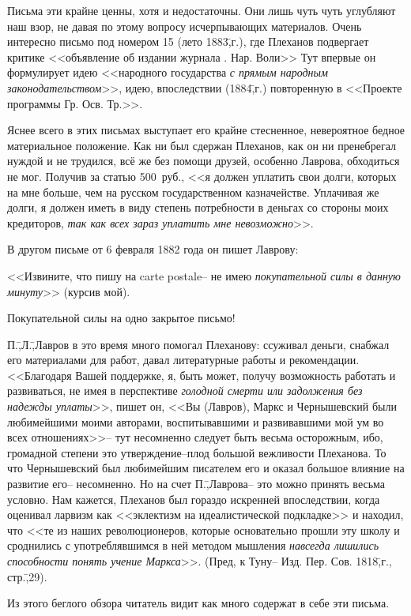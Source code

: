 Письма эти крайне ценны, хотя и недостаточны. Они лишь чуть чуть углубляют наш взор, не давая по этому вопросу исчерпывающих материалов. Очень интересно письмо под номером 15 (лето 1883\=,г.), где Плеханов подвергает критике <<объявление об издании журнала . Нар. Воли\grqq>> Тут впервые он формулирует идею <<народного государства \emph{с прямым народным законодательством}>>, идею, впоследствии (1884\=,г.) повторенную в <<Проекте программы Гр. Осв. Тр.>>.

Яснее всего в этих письмах выступает его крайне стесненное, невероятное бедное материальное положение. Как ни был сдержан Плеханов, как он ни пренебрегал нуждой и не трудился, всё же без помощи друзей, особенно Лаврова, обходиться не мог. Получив за статью 500~руб., <<я должен уплатить свои долги, которых на мне больше, чем на русском государственном казначействе. Уплачивая же долги, я должен иметь в виду степень потребности в деньгах со стороны моих кредиторов, \emph{так как всех зараз уплатить мне невозможно}>>.

В другом письме от 6 февраля 1882 года он пишет Лаврову:

<<Извините, что пишу на carte postale\--- не имею \emph{покупательной силы в данную минуту}>> (курсив мой).

Покупательной силы на одно закрытое письмо!

П.\=,Л.\=,Лавров в это время много помогал Плеханову: ссуживал деньги, снабжал его материалами для работ, давал литературные работы и рекомендации. <<Благодаря Вашей поддержке, я, быть может, получу возможность работать и развиваться, не имея в перспективе \emph{голодной смерти или задолжения без надежды уплаты}>>, пишет он, <<Вы (Лавров), Маркс и Чернышевский были любимейшими моими авторами, воспитывавшими и развивавшими мой ум во всех отношениях>>\--- тут несомненно следует быть весьма осторожным, ибо, громадной степени это утверждение\---плод большой вежливости Плеханова. То что Чернышевский был любимейшим писателем его и оказал большое влияние на развитие его\--- несомненно. Но на счет П.\=,Лаврова\--- это можно принять весьма условно. Нам кажется, Плеханов был гораздо искренней впоследствии, когда оценивал ларвизм как <<эклектизм на идеалистической подкладке>> и находил, что <<те из наших революционеров, которые основательно прошли эту школу и сроднились с употреблявшимся в ней методом мышления \emph{навсегда лишились способности понять учение Маркса}>>. (Пред, к Туну\--- Изд. Пер. Сов. 1818\=,г., стр.\=,29).

Из этого беглого обзора читатель видит как много содержат в себе эти письма.

